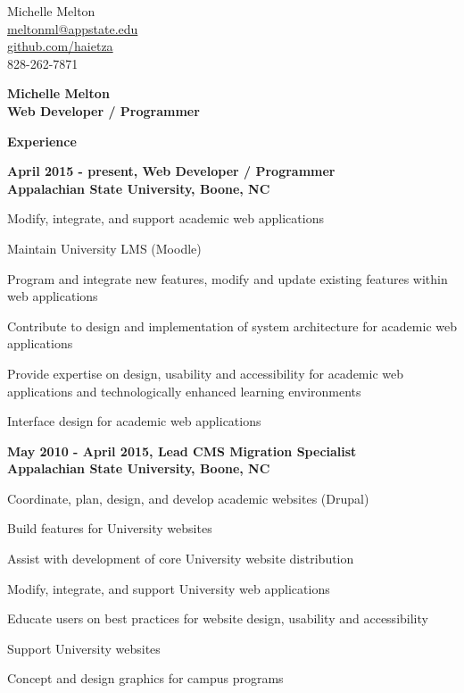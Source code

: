 \documentclass[letterpaper,10pt,final]{memoir}
\newcommand{\Sep}{\vspace{1.5em}}
\newcommand{\SmallSep}{\vspace{0.5em}}
\newcommand{\CVSection}[1]
	{\Large\textbf{#1}\par
	\SmallSep\normalsize\normalfont}
\newcommand{\CVItem}[1]
	{\textbf{\color{BrickRed} #1}}
\begin{document}
\begin{flushright}\small
	Michelle Melton\\
	\url{meltonml@appstate.edu}\\
	\url{github.com/haietza}\\
	828-262-7871
\end{flushright}\normalsize
\framebreak


\Huge\bfseries {\color{BrickRed} Michelle Melton}\\
\Large\bfseries  Web Developer / Programmer\\

\normalsize\normalfont

\CVSection{Experience}
\CVItem{April 2015 - present, Web Developer / Programmer\\
Appalachian State University, Boone, NC}
\begin{compactitem}[\color{BrickRed}$\circ$]
	\item Modify, integrate, and support academic web applications
	\item Maintain University LMS (Moodle)
	\item Program and integrate new features, modify and update existing features within web applications
	\item Contribute to design and implementation of system architecture for academic web applications
	\item Provide expertise on design, usability and accessibility for academic web applications and technologically enhanced learning environments
	\item Interface design for academic web applications
\end{compactitem}
\Sep

\CVItem{May 2010 - April 2015, Lead CMS Migration Specialist\\
Appalachian State University, Boone, NC}
\begin{compactitem}[\color{BrickRed}$\circ$]
	\item Coordinate, plan, design, and develop academic websites (Drupal)
	\item Build features for University websites
	\item Assist with development of core University website distribution
	\item Modify, integrate, and support University web applications
	\item Educate users on best practices for website design, usability and accessibility
	\item Support University websites
	\item Concept and design graphics for campus programs
\end{compactitem}
\Sep
\end{document}
